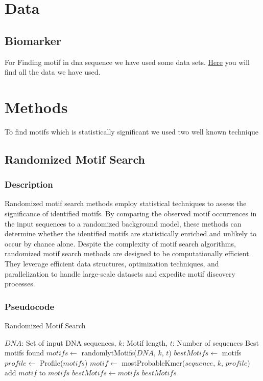 \documentclass[11pt]{article}
\begin{document}
\section{Data}
           \subsection{Biomarker}
           For Finding motif in dna sequence we have used some data sets.
           \href{https://github.com/Superb-Man/Bio-Info/tree/master/data}{Here} you will find all the data we have used.
\section{Methods}
To find motifs which is statistically significant we used two well known technique 
\subsection{Randomized Motif Search}
\subsubsection{Description}
Randomized motif search methods employ statistical techniques to assess the significance of identified motifs. By comparing the observed motif occurrences in the input sequences to a randomized background model, these methods can determine whether the identified motifs are statistically enriched and unlikely to occur by chance alone.
Despite the complexity of motif search algorithms, randomized motif search methods are designed to be computationally efficient. They leverage efficient data structures, optimization techniques, and parallelization to handle large-scale datasets and expedite motif discovery processes.
\subsubsection{Pseudocode}

\begin{algorithm}
\caption{Randomized Motif Search}
\label{alg:randomized_motif_search}
\begin{algorithmic}[1]
\REQUIRE $DNA$: Set of input DNA sequences, $k$: Motif length, $t$: Number of sequences
\ENSURE Best motifs found
\STATE $motifs \leftarrow$ randomlytMotifs($DNA$, $k$, $t$)
\STATE $bestMotifs \leftarrow$ motifs
    \STATE $profile \leftarrow$ Profile($motifs$)
        \STATE $motif \leftarrow$ mostProbableKmer($sequence$, $k$, $profile$)
        \STATE add $motif$ to $motifs$
    \ENDFOR
        \STATE $bestMotifs \leftarrow motifs$
    \ELSE
        \RETURN $bestMotifs$
    \ENDIF
\ENDWHILE
\end{algorithmic}
\end{algorithm}
\newpage
\end{document}
